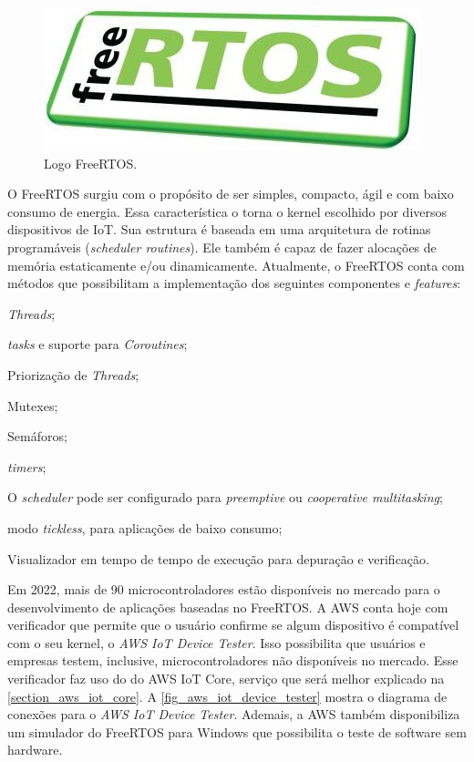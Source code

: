 \documentclass[
    12pt,
    openright,
    twoside,
    a4paper,
    english,
    spanish,
    brazil,
    ]{abntex2}
\begin{document}
\begin{figure}[htb]
	\caption{Logo FreeRTOS.}\label{fig_logo_free_rtos}
	\begin{center}
		\includegraphics[scale=1.5]{Images/Logo_freeRTOS.png}
	\end{center}
\end{figure}

O FreeRTOS surgiu com o propósito de ser simples, compacto, ágil e com baixo consumo de energia. Essa característica o torna o kernel escolhido por diversos dispositivos de IoT. Sua estrutura é baseada em uma arquitetura de rotinas programáveis (\textit{scheduler routines}). Ele também é capaz de fazer alocações de memória estaticamente e/ou dinamicamente. Atualmente, o FreeRTOS conta com métodos que possibilitam a implementação dos seguintes componentes e \textit{features}:
\begin{alineas}
	\item \textit{Threads};
	\item \textit{tasks} e suporte para \textit{Coroutines};
	\item Priorização de \textit{Threads};
	\item Mutexes;
	\item Semáforos;
	\item \textit{timers};
	\item O \textit{scheduler} pode ser configurado para \textit{preemptive} ou \textit{cooperative multitasking};
	\item modo \textit{tickless}, para aplicações de baixo consumo;
	\item Visualizador em tempo de tempo de execução para depuração e verificação.
\end{alineas}

Em 2022, mais de 90 microcontroladores estão disponíveis no mercado para o desenvolvimento de aplicações baseadas no FreeRTOS. A AWS conta hoje com verificador que permite que o usuário confirme se algum dispositivo é compatível com o seu kernel, o \textit{AWS IoT Device Tester}. Isso possibilita que usuários e empresas testem, inclusive, microcontroladores não disponíveis no mercado. Esse verificador faz uso do do AWS IoT Core, serviço que será melhor explicado na \autoref{section_aws_iot_core}. A \autoref{fig_aws_iot_device_tester} mostra o diagrama de conexões para o \textit{AWS IoT Device Tester}. Ademais, a AWS também disponibiliza um simulador do FreeRTOS para Windows que possibilita o teste de software sem hardware.
\end{document}
